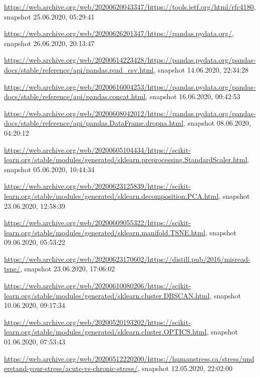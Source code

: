 \begin{appendices}
\url{https://web.archive.org/web/20200620043347/https://tools.ietf.org/html/rfc4180}, snapshot 25.06.2020, 05:29:41

\url{https://web.archive.org/web/20200626201347/https://pandas.pydata.org/}, snapshot 26.06.2020, 20:13:47

\url{https://web.archive.org/web/20200614223428/https://pandas.pydata.org/pandas-docs/stable/reference/api/pandas.read_csv.html}, snapshot 14.06.2020, 22:34:28

\url{https://web.archive.org/web/20200616004253/https://pandas.pydata.org/pandas-docs/stable/reference/api/pandas.concat.html}, snapshot 16.06.2020, 00:42:53

\url{https://web.archive.org/web/20200608042012/https://pandas.pydata.org/pandas-docs/stable/reference/api/pandas.DataFrame.dropna.html}, snapshot 08.06.2020, 04:20:12

\url{https://web.archive.org/web/20200605104434/https://scikit-learn.org/stable/modules/generated/sklearn.preprocessing.StandardScaler.html}, snapshot 05.06.2020, 10:44:34

\url{https://web.archive.org/web/20200623125839/https://scikit-learn.org/stable/modules/generated/sklearn.decomposition.PCA.html}, snapshot 23.06.2020, 12:58:39

\url{https://web.archive.org/web/20200609055322/https://scikit-learn.org/stable/modules/generated/sklearn.manifold.TSNE.html}, snapshot 09.06.2020, 05:53:22

\url{https://web.archive.org/web/20200623170602/https://distill.pub/2016/misread-tsne/}, snapshot 23.06.2020, 17:06:02

\url{https://web.archive.org/web/20200610080206/https://scikit-learn.org/stable/modules/generated/sklearn.cluster.DBSCAN.html}, snapshot 10.06.2020, 09:17:34

\url{https://web.archive.org/web/20200520193202/https://scikit-learn.org/stable/modules/generated/sklearn.cluster.OPTICS.html}, snapshot 01.06.2020, 07:53:43

\url{https://web.archive.org/web/20200512220200/https://humanstress.ca/stress/understand-your-stress/acute-vs-chronic-stress/}, snapshot 12.05.2020, 22:02:00



\end{appendices}
